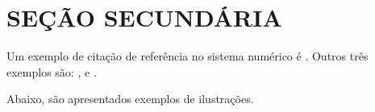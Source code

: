 \documentclass[
        oneside,      %
        english,			
        brazil			 
        ]{abntbibufjf}
\begin{document}
\section{SE\c{C}\~AO SECUND\'ARIA} %

Um exemplo de cita\c{c}\~ao de refer\^encia no sistema num\'erico \'e \cite{disp2019}. Outros três exemplos s\~ao: \cite{Bauman99}, \cite{vet18} e 
\cite{Aguiar2009}.










Abaixo, s\~ao apresentados exemplos de ilustra\c{c}\~oes.

 
\end{document}
